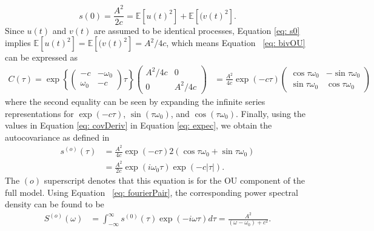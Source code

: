 \documentclass{stat572Style}
\begin{document}
\begin{equation}
\label{eq: s0}
s(0) = \frac{A^{2}}{2c} =  \mathbb{E}[u(t)^{2}] + \mathbb{E}[(v(t)^{2}]. 
\end{equation}
Since $u(t)$ and $v(t)$ are assumed to be identical processes, Equation \ref{eq: s0} implies $\mathbb{E}[u(t)^{2}] =\mathbb{E}[(v(t)^{2}] = A^{2}/4c$, which means Equation ~\ref{eq: bivOU} can be expressed as 
\begin{align}
\label{eq: covDeriv}
 C(\tau) =  \exp \left\{ \left( \begin{array}{cc} -c & -\omega_{0} \\ \omega_{0} & -c \end{array} \right)\tau \right\} \left( \begin{array}{cc} A^{2}/4c & 0 \\ 0 & A^{2}/4c \end{array} \right)  &= 
\frac{A^{2}}{4c} \exp (-c \tau) \left( \begin{array}{cc} \cos \tau \omega_{0} & - \sin \tau \omega_{0} \\ \sin \tau \omega_{0} & \cos \tau \omega_{0}  \end{array} \right) 
\end{align}
where the second equality can be seen by expanding the infinite series representations for $\exp(-c \tau)$, $\sin(\tau \omega_{0})$, and $\cos( \tau \omega_{0})$. 
Finally, using the values in Equation \ref{eq: covDeriv} in Equation \ref{eq: expec}, we obtain the autocovariance  as defined in \citet{Sykulski2016}
\begin{align}
\label{eq: ouAC} \nonumber
s^{(o)}(\tau) & = \frac{A^{2}}{4c} \exp(-c\tau) 2(\cos \tau \omega_{0} + \sin \tau \omega_{0}) \\
&= \frac{A^{2}}{2c} \exp(i \omega_{0}\tau) \exp(-c|\tau|).
\end{align}
 The $(o)$ superscript denotes that this equation is for the OU component of the full model. Using Equation ~\ref{eq: fourierPair}, the corresponding power spectral density can be found to be\begin{align}
\label{eq:ouPSD}
S^{(o)}(\omega) &=  \int_{-\infty}^{\infty} s^{(0)}(\tau) \exp (-i \omega \tau) d \tau = \frac{A^{2}}{(\omega - \omega_{0}) + c^{2}}. 
\end{align}
\end{document}
